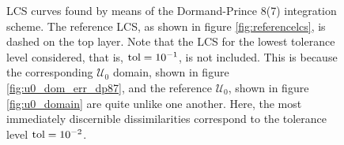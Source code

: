 \begin{figure}[htpb]
    \centering
    
    \caption[LCS curves found by means of the Dormand-Prince 8(7) integration
    scheme]{
        LCS curves found by means of the Dormand-Prince 8(7) integration
        scheme. The reference LCS, as shown in figure
        \ref{fig:referencelcs}, is dashed on the top layer. Note that
        the LCS for the lowest tolerance level considered, that is,
        $\textnormal{tol}=10^{-1}$, is not included. This is because the
        corresponding $\mathcal{U}_{0}$ domain, shown in figure
        \ref{fig:u0_dom_err_dp87}, and the reference $\mathcal{U}_{0}$, shown in figure
        \ref{fig:u0_domain} are quite unlike one another. Here, the most immediately
        discernible dissimilarities correspond to the tolerance level
    $\textnormal{tol}=10^{-2}$.}
    \label{fig:lcs_rkdp87}
\end{figure}
